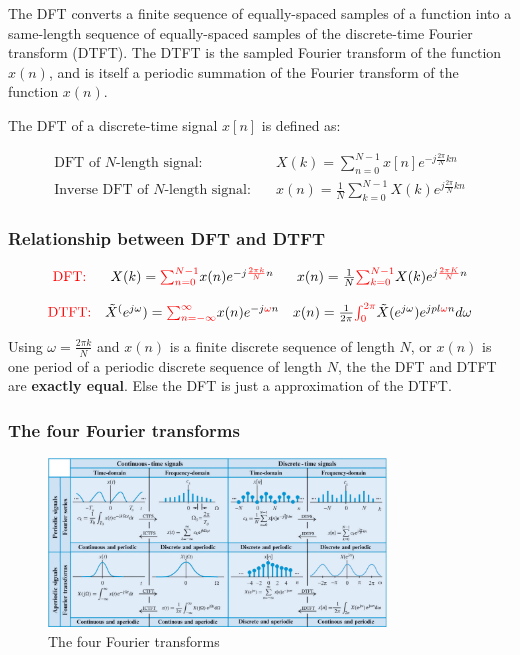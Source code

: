\documentclass{article}
\begin{document}
The DFT converts a finite sequence of equally-spaced samples of a function into a same-length sequence of equally-spaced samples of the discrete-time Fourier transform (DTFT). The DTFT is the sampled Fourier transform of the function $x(n)$, and is itself a periodic summation of the Fourier transform of the function $x(n)$.

The DFT of a discrete-time signal $x[n]$ is defined as:

\begin{align}
    \text{DFT of } N\text{-length signal:} \quad & X(k) = \sum_{n=0}^{N-1} x[n]e^{-j\frac{2\pi}{N}kn} \\
    \text{Inverse DFT of } N\text{-length signal:}  \quad & x(n) = \frac{1}{N}\sum_{k=0}^{N-1} X(k)e^{j\frac{2\pi}{N}kn}
\end{align}

\subsubsection{Relationship between DFT and DTFT}

\begin{align}
    \begin{matrix}
        \textcolor{red}{\text{DFT:}} & X(k) = \textcolor{red}{\sum_{n=0}^{N-1}} x(n)e^{-j\textcolor{red}{\frac{2\pi k}{N}}n} & x(n) = \frac{1}{N}\textcolor{red}{\sum_{k=0}^{N-1}}X(k)e^{j\textcolor{red}{\frac{2\pi K}{N}}n} \\ \\
        \textcolor{red}{\text{DTFT:}} & \tilde{X}^(e^{j\omega}) = \textcolor{red}{\sum_{n=-\infty}^{\infty}} x(n)e^{-j\textcolor{red}{\omega} n} & x(n) = \frac{1}{2\pi}\textcolor{red}{\int_{0}^{2\pi}}\tilde{X}(e^{j\omega})e^{jpl \textcolor{red}{\omega} n} d\omega
    \end{matrix}
\end{align}

Using $\omega = \frac{2\pi k}{N}$ and $x(n)$ is a finite discrete sequence of length $N$, or $x(n)$ is one period of a periodic discrete sequence of length $N$, the the DFT and DTFT are \textbf{exactly equal}. Else the DFT is just a approximation of the DTFT.
\subsubsection{The four Fourier transforms}

\begin{figure}[h!]
    \centering
    \includegraphics[width=0.8\textwidth]{figures/DFT/fourier_reps.png}
    \caption{The four Fourier transforms}
    \label{fig:furry_transforms}
\end{figure}
\end{document}
